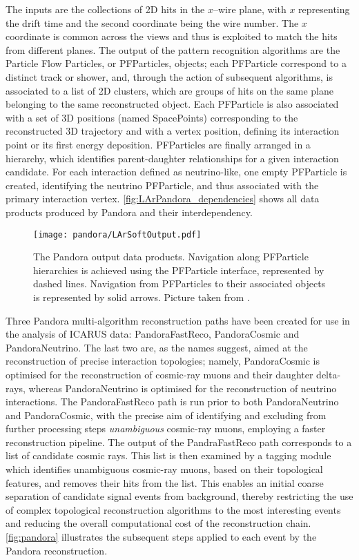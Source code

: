The inputs are the collections of 2D hits in the $x$--wire plane, with $x$ representing the drift time and the second coordinate being the wire number. The $x$ coordinate is common across the views and thus is exploited to match the hits from different planes. The output of the pattern recognition algorithms are the Particle Flow Particles, or PFParticles, objects; each PFParticle correspond to a distinct track or shower, and, through the action of subsequent algorithms, is associated to a list of 2D clusters, which are groups of hits on the same plane belonging to the same reconstructed object. Each PFParticle is also associated with a set of 3D positions (named SpacePoints) corresponding to the reconstructed 3D trajectory and with a vertex position, defining its interaction point or its first energy deposition. PFParticles are finally arranged in a hierarchy, which identifies parent-daughter relationships for a given interaction candidate. For each interaction defined as neutrino-like, one empty PFParticle is created, identifying the neutrino PFParticle, and thus associated with the primary interaction vertex. \autoref{fig:LArPandora_dependencies} shows all data products produced by Pandora and their interdependency. 

\begin{figure}
    \centering
    \texttt{[image: pandora/LArSoftOutput.pdf]}
    \caption[LArPandora output data products]{The Pandora output data products. Navigation along PFParticle hierarchies is achieved using the PFParticle interface, represented by dashed lines. Navigation from PFParticles to their associated objects is represented by solid arrows. Picture taken from \cite{MicroBooNE:2017xvs}. }
    \label{fig:LArPandora_dependencies}
\end{figure}

Three Pandora multi-algorithm reconstruction paths have been created for use in the analysis of ICARUS data: PandoraFastReco, PandoraCosmic and PandoraNeutrino. The last two are, as the names suggest, aimed at the reconstruction of precise interaction topologies; namely,  PandoraCosmic is optimised for the reconstruction of cosmic-ray muons and their daughter delta-rays, whereas PandoraNeutrino is optimised for the reconstruction of neutrino interactions. The PandoraFastReco path is run prior to both PandoraNeutrino and PandoraCosmic, with the precise aim of identifying and excluding from further processing steps \emph{unambiguous} cosmic-ray muons, employing a faster reconstruction pipeline. The output of the PandraFastReco path corresponds to a list of candidate cosmic rays. This list is then examined by a tagging module which identifies unambiguous cosmic-ray muons, based on their topological features, and removes their hits from the list. This enables an initial coarse separation of candidate signal events from background, thereby restricting the use of complex topological reconstruction algorithms to the most interesting events and reducing the overall computational cost of the reconstruction chain. \autoref{fig:pandora} illustrates the subsequent steps applied to each event by the Pandora reconstruction. 

